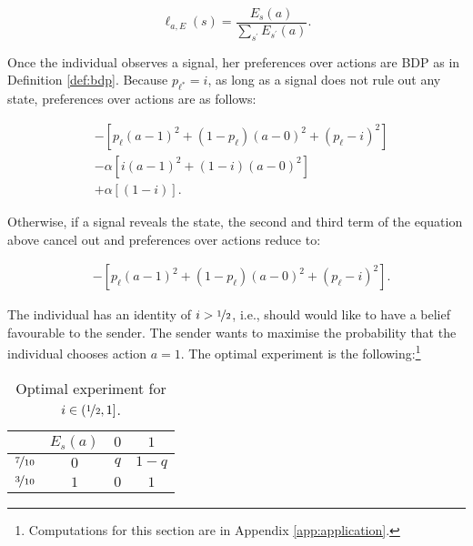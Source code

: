 \[
	\ell_{a,E} \left( s \right) = \frac{E_{s} \left( a \right)}{\sum_{s^{\prime}} E_{s^{\prime}} \left( a \right) }.
\]

Once the individual observes a signal, her preferences over actions are BDP as in Definition \ref{def:bdp}. Because \( p_{\ell^{*}} = i \), as long as a signal does not rule out any state, preferences over actions are as follows:

\begin{align*}
	 & - \left[ p_{\ell} \left( a - 1 \right)^2 + \left( 1 - p_{\ell} \right) \left( a - 0 \right)^2 + \left( p_{\ell} - i \right)^{2} \right] \\
	 & - \alpha \left[ i \left( a - 1 \right)^2 + \left( 1 - i \right) \left( a - 0 \right)^2 \right]                                          \\
	 & + \alpha \left[ \left( 1 - i \right) \right] .
\end{align*}

Otherwise, if a signal reveals the state, the second and third term of the equation above cancel out and preferences over actions reduce to:

\begin{align*}
	 & - \left[ p_{\ell} \left( a - 1 \right)^2 + \left( 1 - p_{\ell} \right) \left( a - 0 \right)^2 + \left( p_{\ell} - i \right)^{2} \right].
\end{align*}

The individual has an identity of \( i >  \nicefrac{1}{2} \), i.e., should would like to have a belief favourable to the sender. The sender wants to maximise the probability that the individual chooses action \( a = 1 \). The optimal experiment is the following:\footnote{Computations for this section are in Appendix \ref{app:application}.}

\begin{table}[H]
	\centering
	\begin{tabular}{c c | c c}
		                       & \( E_s \left( a \right) \) & \( 0 \) & \( 1 \)   \\
		\hline
		\( \nicefrac{7}{10} \) & \( 0 \)                    & \( q \) & \( 1-q \) \\
		\( \nicefrac{3}{10} \) & \( 1 \)                    & \( 0 \) & \( 1 \)   \\
	\end{tabular}
	\caption{Optimal experiment for \( i \in \left( \nicefrac{1}{2}, 1 \right] \).}
	\label{tab:experiment2}
\end{table}

